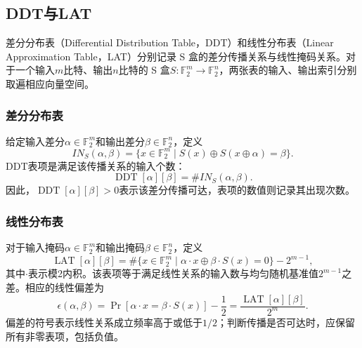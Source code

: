 \subsection{DDT与LAT}

差分分布表（Differential Distribution Table，DDT）和线性分布表（Linear Approximation Table，LAT）分别记录 S 盒的差分传播关系与线性掩码关系。对于一个输入$m$比特、输出$n$比特的 S 盒$S:\mathbb{F}_2^m\to\mathbb{F}_2^n$，两张表的输入、输出索引分别取遍相应向量空间。

\subsubsection{差分分布表}

给定输入差分$\alpha\in\mathbb{F}_2^m$和输出差分$\beta\in\mathbb{F}_2^n$，定义
\[
IN_S(\alpha,\beta)
=\{x\in\mathbb{F}_2^m\mid S(x)\oplus S(x\oplus\alpha)=\beta\}.
\]
DDT表项是满足该传播关系的输入个数：
\[
\operatorname{DDT}[\alpha][\beta]
=\#IN_S(\alpha,\beta).
\]
因此，$\operatorname{DDT}[\alpha][\beta]>0$表示该差分传播可达，表项的数值则记录其出现次数。

\subsubsection{线性分布表}

对于输入掩码$\alpha\in\mathbb{F}_2^m$和输出掩码$\beta\in\mathbb{F}_2^n$，定义
\[
\operatorname{LAT}[\alpha][\beta]
=\#\{x\in\mathbb{F}_2^m\mid
\alpha\cdot x\oplus\beta\cdot S(x)=0\}-2^{m-1},
\]
其中$\cdot$表示模2内积。该表项等于满足线性关系的输入数与均匀随机基准值$2^{m-1}$之差。相应的线性偏差为
\[
\epsilon(\alpha,\beta)
=\Pr[\alpha\cdot x=\beta\cdot S(x)]-\frac12
=\frac{\operatorname{LAT}[\alpha][\beta]}{2^m}.
\]
偏差的符号表示线性关系成立频率高于或低于$1/2$；判断传播是否可达时，应保留所有非零表项，包括负值。
